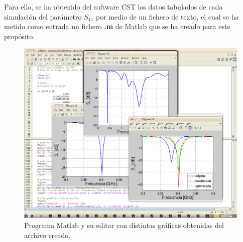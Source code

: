 Para ello, se ha obtenido del software CST los datos tabulados de cada simulación del parámetro $S_{11}$ por medio de un fichero de texto, el cual se ha metido como entrada un fichero \textbf{.m} de Matlab que se ha creado para este propósito.

\begin{figure}[!htb]
    \centering
    \includegraphics[scale=0.35]{./Metodologia/matlab2}
    \caption{Programa Matlab y su editor con distintas gráficas obtenidas del archivo creado.}
    \label{fig:fig4.9}
\end{figure}